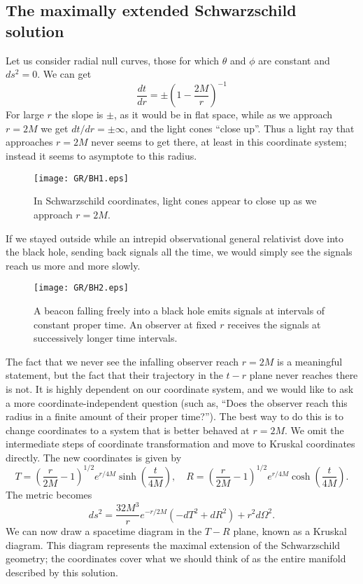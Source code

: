 \subsection{The maximally extended Schwarzschild solution}
Let us consider radial null curves, those for which $\theta$ and $\phi$ are constant and $ds^2 = 0$. We can get
\[\frac{dt}{dr} = \pm \left(1 -\frac{2M}{r} \right)^{-1}\]
For large $r$ the slope is $\pm$, as it would be in flat space, while as we approach $r = 2M$ we get $dt / dr = \pm \infty$, and the light cones ``close up''. 
Thus a light ray that approaches $r = 2M$ never seems to
get there, at least in this coordinate system; instead it seems to asymptote to this radius.

\begin{figure}[!htb]
\centering
\texttt{[image: GR/BH1.eps]}
\caption{In Schwarzschild coordinates, light cones appear to close up as we approach $r = 2M$.}
\end{figure}

\noindent
If we stayed outside while an intrepid observational general relativist dove into the black hole, sending back
signals all the time, we would simply see the signals reach us more and more slowly.

\begin{figure}[!htb]
\centering
\texttt{[image: GR/BH2.eps]}
\caption{A beacon falling freely into a black hole emits signals at intervals of constant proper time. An observer at fixed $r$ receives the signals at successively longer
time intervals.}
\end{figure}

\noindent
The fact that we never see the infalling observer reach $r = 2M$ is a meaningful statement, but the fact that their trajectory in the $t-r$ plane never reaches there is not. 
It is highly dependent on our coordinate system, and we would like to ask a more coordinate-independent question (such as, ``Does the observer reach this radius in a finite amount of their proper time?''). 
The best way to do this is to change coordinates to a system that is better behaved at $r = 2M$. We omit the intermediate steps of coordinate transformation and move to Kruskal coordinates directly. The new coordinates is given by
\[T = \left( \frac{r}{2M} -1 \right)^{1/2} e^{r/4M}\sinh \left( \frac{t}{4M}\right), \quad R = \left( \frac{r}{2M} -1 \right)^{1/2} e^{r/4M}\cosh\left( \frac{t}{4M}\right).\]
The metric becomes
\[ds^2 = \frac{32M^3}{r}e^{-r/2M}(-dT^2+dR^2) + r^2 d\Omega^2.\]
We can now draw a spacetime diagram in the $T-R$ plane, known as a Kruskal diagram. This diagram represents the maximal extension of the Schwarzschild geometry; the coordinates cover what we should think of as
the entire manifold described by this solution.

